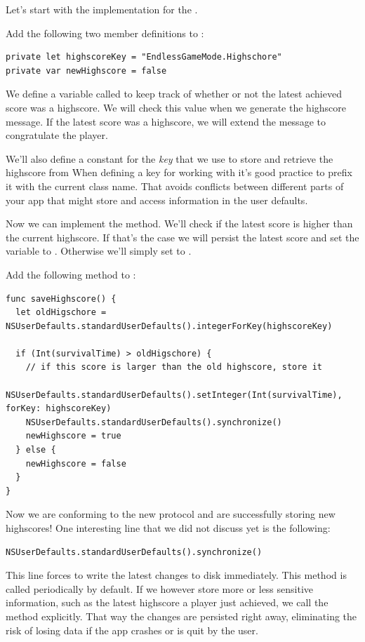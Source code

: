 Let's start with the implementation for the .

\begin{leftbar}
Add the following two member definitions to :
\begin{lstlisting}
private let highscoreKey = "EndlessGameMode.Highschore"
private var newHighscore = false
\end{lstlisting}
\end{leftbar}

We define a variable called  to keep track of whether
or not the latest achieved score was a highscore. We will check this value when
we generate the highscore message. If the latest score was a highscore, we will
extend the message to congratulate the player.

We'll also define a constant for the \textit{key} that we use to store and
retrieve the highscore from  When defining a key for
working with  it's good practice to prefix it with the current class name. That avoids conflicts between
different parts of your app that might store and access information in the user
defaults.

Now we can implement the  method. We'll check if
the latest score is higher than the current highscore. If that's the case we
will persist the latest score and set the  variable to
. Otherwise we'll simply set  to
.

\begin{leftbar}
Add the following method to :
\begin{lstlisting}
func saveHighscore() {
  let oldHigschore = NSUserDefaults.standardUserDefaults().integerForKey(highscoreKey)

  if (Int(survivalTime) > oldHigschore) {
    // if this score is larger than the old highscore, store it
    NSUserDefaults.standardUserDefaults().setInteger(Int(survivalTime), forKey: highscoreKey)
    NSUserDefaults.standardUserDefaults().synchronize()
    newHighscore = true
  } else {
    newHighscore = false
  }
}
\end{lstlisting}
\end{leftbar}

Now we are conforming to the new  protocol and are
successfully storing new highscores! One interesting line that we did not
discuss yet is the following:
\begin{lstlisting}
NSUserDefaults.standardUserDefaults().synchronize()
\end{lstlisting}
This line forces  to write the latest changes to disk
immediately. This method is called periodically by default. If we however store
more or less sensitive information, such as the latest highscore a player just
achieved, we call the method explicitly. That way the changes are persisted
right away, eliminating the risk of losing data if the app crashes or is quit by
the user.

